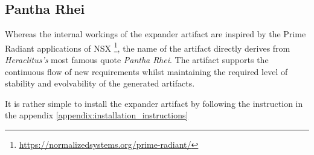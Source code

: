 \subsection{Pantha Rhei}

Whereas the internal workings of the expander artifact are inspired by the Prime Radiant
applications of NSX \footnote{\url{https://normalizedsystems.org/prime-radiant/}}, the
name of the artifact directly derives from \emph{Heraclitus's} most famous quote
\emph{Pantha Rhei}. The artifact supports the continuous flow of new requirements whilst
maintaining the required level of stability and evolvability of the generated artifacts.

It is rather simple to install the expander artifact by following the instruction in the
appendix \ref{appendix:installation_instructions} 